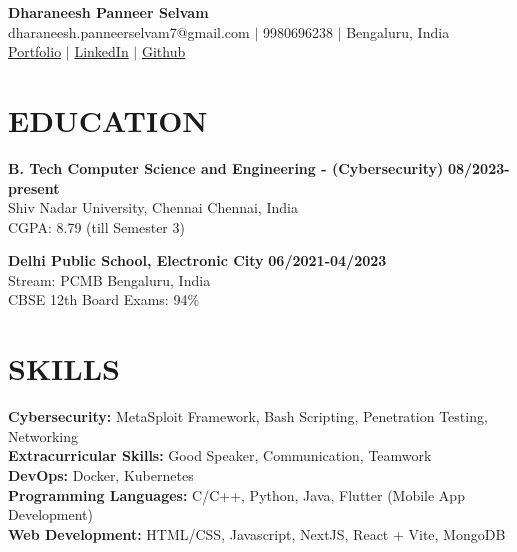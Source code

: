 \documentclass[10pt, letterpaper]{article} %
\begin{document}
\RaggedRight %

{\Large\bfseries Dharaneesh Panneer Selvam} \\
\vspace{0.1em} %
dharaneesh.panneerselvam7@gmail.com $|$ 9980696238 $|$ Bengaluru, India \\
\href{https://dharaneesh-p.vercel.app/}{Portfolio} $|$ \href{https://linkedin.com/in/dharaneesh-panneer-selvam}{LinkedIn} $|$ \href{https://github.com/Apex077}{Github} \\
\vspace{0.1em} %

\section*{EDUCATION}
\textbf{B. Tech Computer Science and Engineering - (Cybersecurity)} \hfill \textbf{08/2023-present} \\
Shiv Nadar University, Chennai \hfill Chennai, India \\
CGPA: 8.79 (till Semester 3)

\textbf{Delhi Public School, Electronic City} \hfill \textbf{06/2021-04/2023} \\
Stream: PCMB \hfill Bengaluru, India \\
CBSE 12th Board Exams: 94\%

\section*{SKILLS}
\textbf{Cybersecurity:} MetaSploit Framework, Bash Scripting, Penetration Testing, Networking \\
\textbf{Extracurricular Skills:} Good Speaker, Communication, Teamwork \\
\textbf{DevOps:} Docker, Kubernetes \\
\textbf{Programming Languages:} C/C++, Python, Java, Flutter (Mobile App Development) \\
\textbf{Web Development:} HTML/CSS, Javascript, NextJS, React + Vite, MongoDB

\end{document}
